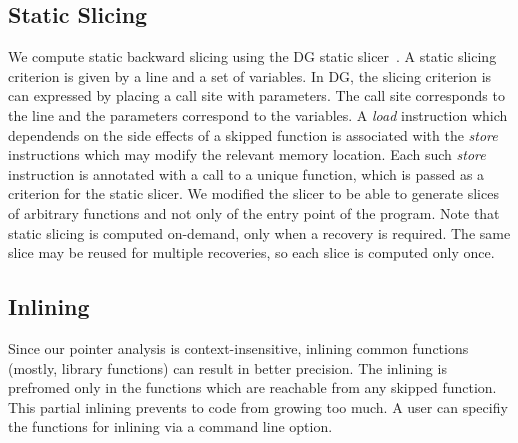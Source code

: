 \subsection{Static Slicing}
We compute static backward slicing using the DG static slicer~\cite{dg}.
A static slicing criterion is given by a line and a set of variables.
In DG, the slicing criterion is can expressed by placing a call site with parameters.
The call site corresponds to the line and the parameters correspond to the variables.
A \textit{load} instruction which dependends on the side effects of a skipped function
is associated with the \textit{store} instructions which may modify the relevant memory location.
Each such \textit{store} instruction is annotated with a call to a unique function,
which is passed as a criterion for the static slicer.
We modified the slicer to be able to generate slices of arbitrary functions and not
only of the entry point of the program. Note that static slicing is
computed on-demand, only when a recovery is required. The same slice
may be reused for multiple recoveries, so each slice is computed only
once.

\subsection{Inlining}
Since our pointer analysis is context-insensitive,
inlining common functions (mostly, library functions) can result in better precision.
The inlining is prefromed only in the functions which are reachable from any skipped function.
This partial inlining prevents to code from growing too much.
A user can specifiy the functions for inlining via a command line option.

